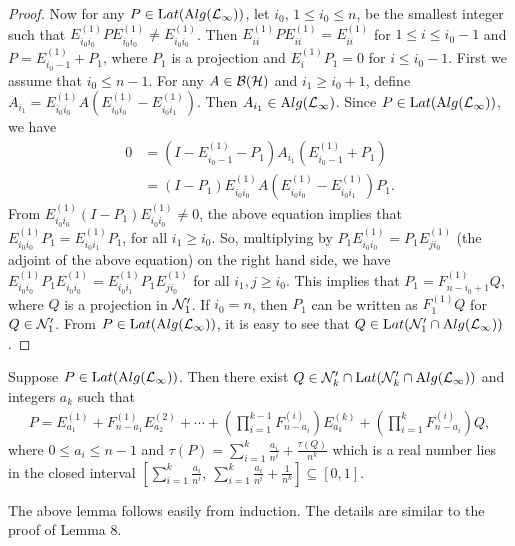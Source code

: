 \begin{proof}
Now for any $P \in \mathrm Lat(\mathrm Alg(\mathcal L_\infty))$, let $i_0$, $1\le i_0\le
n$, be the smallest integer such that
$E_{i_{0}i_{0}}^{(1)}PE_{i_{0}i_{0}}^{(1)} \neq E_{i_{0}
i_{0}}^{(1)}$. Then $E_{i i}^{(1)}PE_{ii}^{(1)} = E_{ii}^{(1)}$
for $1\leq i \leq i_{0}-1$ and $P = E_{i_{0}-1}^{(1)} + P_{1}$,
where $P_{1}$ is a projection and $E_{i}^{(1)}P_{1} = 0$ for $i\leq
i_0-1$. First we assume that $i_{0} \leq n-1$. For any $A \in
\mathcal B(\mathcal H)$ and $i_1\geq i_0+1$, define $A_{i_{1}} = E_{i_{0}
i_{0}}^{(1)}A(E_{i_{0} i_{0}}^{(1)} - E_{i_{0}i_{1}}^{(1)})$. Then
$A_{i_1} \in \mathrm Alg(\mathcal L_\infty)$. Since $P \in
\mathrm Lat(\mathrm Alg(\mathcal L_\infty))$, we have
\begin{align*}
 0 &= (I - E_{i_{0}-1}^{(1)} - P_{1})A_{i_{1}}(E_{i_{0}-1}^{(1)} +
 P_{1})\\
   &= (I - P_{1})E_{i_{0}i_{0}}^{(1)}A(E_{i_{0}i_{0}}^{(1)} -
E_{i_{0} i_{1}}^{(1)})P_{1}.
\end{align*}
From
$E_{i_{0}i_{0}}^{(1)}(I - P_{1})E_{i_{0} i_{0}}^{(1)} \neq
0$, the above equation implies that $E_{i_{0} i_{0}}^{(1)}P_{1} =
E_{i_{0}i_{1}}^{(1)}P_{1}$, for all $i_1\ge i_0$. So, multiplying
by $P_1E_{i_0i_0}^{(1)}=P_1E_{ji_0}^{(1)}$ (the adjoint of the
above equation) on the right hand side, we have $E_{i_{0}
i_{0}}^{(1)}P_{1}E_{i_{0}i_{0}}^{(1)} = E_{i_{0}
i_1}^{(1)}P_{1}E_{ji_{0}}^{(1)}$ for all $i_1, j \geq i_{0}$. This
implies that $P_{1} = F_{n - i_{0}+1}^{(1)}Q$, where $Q$ is a
projection in $\mathcal N_{1}'$. If $i_{0} = n$, then  $P_{1}$ can be
written as $F_{1}^{(1)}Q$ for $Q \in \mathcal N_{1}'$. From $P \in
\mathrm Lat(\mathrm Alg(\mathcal L_\infty))$, it is easy to see that $Q \in
\mathrm Lat(\mathcal N_{1}' \cap \mathrm Alg(\mathcal L_\infty))$.
\end{proof}

\begin{lemma}
Suppose $P \in
\mathrm Lat(\mathrm Alg(\mathcal L_\infty))$. Then there exist $Q \in \mathcal N_{k}' \cap
\mathrm Lat({\mathcal N}_{k}' \cap \mathrm Alg(\mathcal L_\infty))$ and integers $a_k$ such
that
\begin{align*}
P = E_{a_{1}}^{(1)} + F_{n-a_{1}}^{(1)}E_{a_{2}}^{(2)} + \cdots
+(\prod_{i = 1}^{k-1}F_{n-a_{i}}^{(i)})E_{a_{k}}^{(k)} + (\prod_{i
= 1}^{k}F_{n-a_{i}}^{(i)})Q,
\end{align*}
where $0 \leq a_{i} \leq n-1$ and $\tau(P) =
\sum_{i=1}^{k}\frac{a_{i}}{n^{i}} + \frac{\tau(Q)}{n^{k}}$ which
is a real number lies in the closed interval
$\left[\sum_{i=1}^{k}\frac{a_{i}}{n^{i}},\
\sum_{i=1}^{k}\frac{a_{i}}{n^{i}} +
\frac{1}{n^{k}}\right]\subseteq[0,1]$.
\end{lemma}

The above lemma follows easily from induction. The details are
similar to the proof of Lemma 8.

